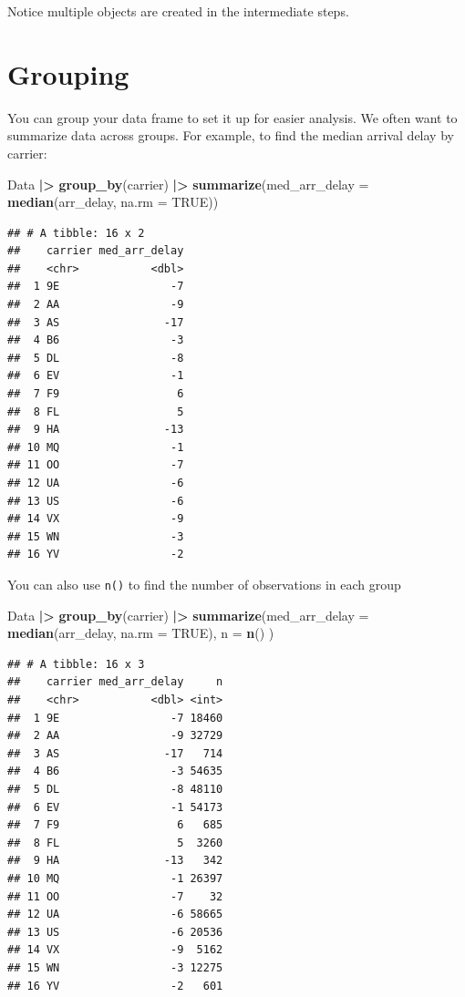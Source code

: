 \documentclass[
]{book}
\newenvironment{Shaded}{\begin{snugshade}}{\end{snugshade}}
\newcommand{\AttributeTok}[1]{\textcolor[rgb]{0.13,0.29,0.53}{#1}}
\newcommand{\ConstantTok}[1]{\textcolor[rgb]{0.56,0.35,0.01}{#1}}
\newcommand{\FunctionTok}[1]{\textcolor[rgb]{0.13,0.29,0.53}{\textbf{#1}}}
\newcommand{\NormalTok}[1]{#1}
\newcommand{\SpecialCharTok}[1]{\textcolor[rgb]{0.81,0.36,0.00}{\textbf{#1}}}
\theoremstyle{definition}
\theoremstyle{definition}
\theoremstyle{definition}
\theoremstyle{definition}
\theoremstyle{remark}
\begin{document}
Notice multiple objects are created in the intermediate steps.

\hypertarget{grouping}{%
\section{Grouping}\label{grouping}}

You can group your data frame to set it up for easier analysis. We often want to summarize data across groups. For example, to find the median arrival delay by carrier:

\begin{Shaded}
\begin{Highlighting}[]
\NormalTok{Data }\SpecialCharTok{|\textgreater{}}
  \FunctionTok{group\_by}\NormalTok{(carrier) }\SpecialCharTok{|\textgreater{}} 
  \FunctionTok{summarize}\NormalTok{(}\AttributeTok{med\_arr\_delay =} \FunctionTok{median}\NormalTok{(arr\_delay, }\AttributeTok{na.rm =} \ConstantTok{TRUE}\NormalTok{))}
\end{Highlighting}
\end{Shaded}

\begin{verbatim}
## # A tibble: 16 x 2
##    carrier med_arr_delay
##    <chr>           <dbl>
##  1 9E                 -7
##  2 AA                 -9
##  3 AS                -17
##  4 B6                 -3
##  5 DL                 -8
##  6 EV                 -1
##  7 F9                  6
##  8 FL                  5
##  9 HA                -13
## 10 MQ                 -1
## 11 OO                 -7
## 12 UA                 -6
## 13 US                 -6
## 14 VX                 -9
## 15 WN                 -3
## 16 YV                 -2
\end{verbatim}

You can also use \texttt{n()} to find the number of observations in each group

\begin{Shaded}
\begin{Highlighting}[]
\NormalTok{Data }\SpecialCharTok{|\textgreater{}} 
  \FunctionTok{group\_by}\NormalTok{(carrier) }\SpecialCharTok{|\textgreater{}} 
  \FunctionTok{summarize}\NormalTok{(}\AttributeTok{med\_arr\_delay =} \FunctionTok{median}\NormalTok{(arr\_delay, }\AttributeTok{na.rm =} \ConstantTok{TRUE}\NormalTok{), }
    \AttributeTok{n =} \FunctionTok{n}\NormalTok{()}
\NormalTok{  )}
\end{Highlighting}
\end{Shaded}

\begin{verbatim}
## # A tibble: 16 x 3
##    carrier med_arr_delay     n
##    <chr>           <dbl> <int>
##  1 9E                 -7 18460
##  2 AA                 -9 32729
##  3 AS                -17   714
##  4 B6                 -3 54635
##  5 DL                 -8 48110
##  6 EV                 -1 54173
##  7 F9                  6   685
##  8 FL                  5  3260
##  9 HA                -13   342
## 10 MQ                 -1 26397
## 11 OO                 -7    32
## 12 UA                 -6 58665
## 13 US                 -6 20536
## 14 VX                 -9  5162
## 15 WN                 -3 12275
## 16 YV                 -2   601
\end{verbatim}
\end{document}
